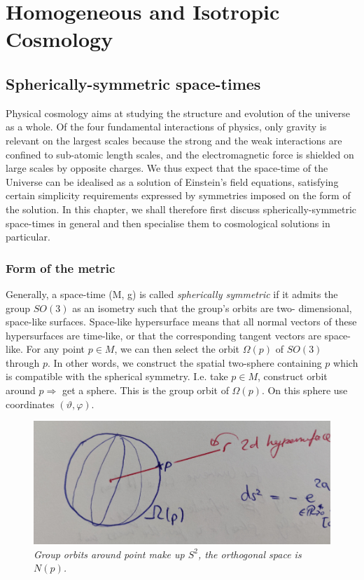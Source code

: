 	
	
	
	
	\newpage
	\section{Homogeneous and Isotropic Cosmology}
	\subsection{Spherically-symmetric space-times}
	Physical cosmology aims at studying the structure and evolution of the
	universe as a whole. Of the four fundamental interactions of physics,
	only gravity is relevant on the largest scales because the strong and
	the weak interactions are confined to sub-atomic length scales, and the
	electromagnetic force is shielded on large scales by opposite charges.
	We thus expect that the space-time of the Universe can be idealised as
	a solution of Einstein’s field equations, satisfying certain simplicity requirements expressed by symmetries imposed on the form of the solution.
	In this chapter, we shall therefore first discuss spherically-symmetric
	space-times in general and then specialise them to cosmological solutions
	in particular.
	
\subsubsection{Form of the metric}
	Generally, a space-time (M, g) is called \emph{spherically symmetric} if it admits
	the group $SO(3)$ as an isometry such that the group’s orbits are two-
	dimensional, space-like surfaces. Space-like hypersurface means that all normal vectors of these hypersurfaces are time-like, or that the corresponding tangent vectors are space-like.
	For any point $p \in M$, we can then select the orbit $Ω(p)$ of $SO(3)$ through
	$p$. In other words, we construct the spatial two-sphere containing $p$
	which is compatible with the spherical symmetry. I.e. take $p\in M$, construct orbit around $p\Rightarrow$ get a sphere. This is the group orbit of $\Omega(p)$. On this sphere use coordinates $(\vartheta, \varphi)$.
	
\begin{figure}[h!]
	\centering
	\includegraphics[width=0.7\linewidth]{gfx/SphericallySymmetricSpacetime}
	\caption{\itshape Group orbits around point make up $S^2$, the orthogonal space is $N(p)$.}
	\label{fig:sphericallysymmetricspacetime}
\end{figure}
	
